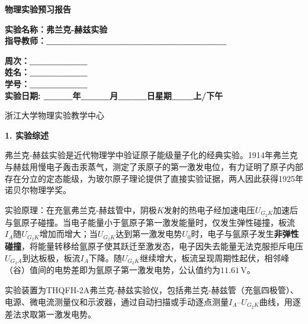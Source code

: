 \documentclass[a4paper,12pt]{article}
\begin{document}
\begin{center}
    \vspace*{2cm}
    {\fontsize{36pt}{43pt}\selectfont \textbf{物理实验预习报告}}
    \vspace{3cm}
\end{center}

\begin{center}
    \fontsize{16pt}{24pt}\selectfont
    \textbf{实验名称：弗兰克-赫兹实验\quad} \\[0.5em]
    \textbf{指导教师：\_\_\_\_\_\_\_\_\_\_\_\_\_\_\_\_\_\_\_\_\_\_\_\_\_}
\end{center}

\vspace{2cm}

\begin{center}
    \fontsize{14pt}{28pt}\selectfont
    \textbf{周次：\_\_\_\_\_\_\_\_} \\
    \textbf{姓名：\_\_\_\_\_\_\_\_} \\
    \textbf{学号：\_\_\_\_\_\_\_\_} \\[0.5em]
    \textbf{实验日期: \_\_\_\_年\_\_\_\_月\_\_\_\_日\quad 星期\_\_\_上/下午}
\end{center}

\vspace{1.5cm}

\begin{center}
    \fontsize{14pt}{20pt}\selectfont
    浙江大学物理实验教学中心
\end{center}

\newpage


{\fontsize{14pt}{20pt}\selectfont \textbf{1. 实验综述}}

\vspace{0.3cm}

{\fontsize{12pt}{18pt}\selectfont

弗兰克-赫兹实验是近代物理学中验证原子能级量子化的经典实验。1914年弗兰克与赫兹用慢电子轰击汞蒸气，测定了汞原子的第一激发电位，有力证明了原子内部存在分立的定态能级，为玻尔原子理论提供了直接实验证据，两人因此获得1925年诺贝尔物理学奖。

实验原理：在充氩弗兰克-赫兹管中，阴极$K$发射的热电子经加速电压$U_{G_2K}$加速后与氩原子碰撞。当电子能量小于氩原子第一激发能量时，仅发生弹性碰撞，板流$I_A$随$U_{G_2K}$增加而增大；当$U_{G_2K}$达到第一激发电势$U_0$时，电子与氩原子发生\textbf{非弹性碰撞}，将能量转移给氩原子使其跃迁至激发态，电子因失去能量无法克服拒斥电压$U_{G_2A}$到达板极，板流$I_A$下降。随$U_{G_2K}$继续增大，板流呈现周期性起伏，相邻峰（谷）值间的电势差即为氩原子第一激发电势，公认值约为$11.61$\,V。

实验装置为THQFH-2A弗兰克-赫兹实验仪，包括弗兰克-赫兹管（充氩四极管）、电源、微电流测量仪和示波器，通过自动扫描或手动逐点测量$I_A$--$U_{G_2K}$曲线，用逐差法求取第一激发电势。

}
\end{document}
